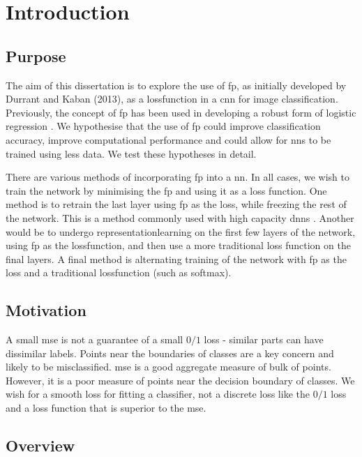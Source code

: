 \chapter{Introduction}

\section{Purpose}

The aim of this dissertation is to explore the use of  \gls{fp}, as initially developed by Durrant and Kaban (2013)\cite{durrant2013sharp}, as a \gls{lossfunction} in a \gls{cnn} for image classification. Previously, the concept of  \gls{fp} has been used in developing a robust form of logistic regression \cite{label_noise}. We hypothesise that the use of  \gls{fp} could improve classification accuracy, improve computational performance and could allow for \gls{nn}s to be trained using less data. We test these hypotheses in detail. \bigskip

There are various methods of incorporating  \gls{fp} into a  \gls{nn}. In all cases, we wish to train the network by minimising the \gls{fp} and using it as a loss function. One method is to retrain the last layer using  \gls{fp} as the loss, while freezing the rest of the network. This is a method commonly used with high capacity \gls{dnn}s \cite{transfer_learning}. Another would be to undergo \gls{representationlearning} on the first few \gls{layer}s of the network, using  \gls{fp} as the \gls{lossfunction}, and then use a more traditional loss function on the final layers. A final method is alternating training of the network with  \gls{fp} as the \gls{loss} and a traditional \gls{lossfunction} (such as \gls{softmax}). 

\section{Motivation}

A small  \gls{mse} is not a guarantee of a small $0/1$ loss - similar parts can have dissimilar labels. Points near the boundaries of classes are a key concern and likely to be misclassified.  \gls{mse} is a good aggregate measure of bulk of points. However, it is a poor measure of points near the decision boundary of classes. We wish for a smooth loss for fitting a classifier, not a discrete loss like the $0/1$ loss and a loss function that is superior to the  \gls{mse}.

\section{Overview}

